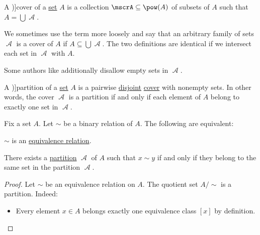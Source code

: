 \begin{comments}
\begin{definition}\label{def:set_cover}
  A \term[ru=покрытие (\cite[32]{Гуров2013ТеорияРешёток})]{cover} of a \hyperref[def:set]{set} \( A \) is a collection \( \mscrA \subseteq \pow(A) \) of subsets of \( A \) such that \( A = \bigcup \mscrA \).
\end{definition}
\begin{comments}
  \item We sometimes use the term more loosely and say that an arbitrary family of sets \( \mscrA \) is a cover of \( A \) if \( A \subseteq \bigcup \mscrA \). The two definitions are identical if we intersect each set in \( \mscrA \) with \( A \).

  \item Some authors like \cite[32]{Гуров2013ТеорияРешёток} additionally disallow empty sets in \( \mscrA \).
\end{comments}

\begin{definition}\label{def:set_partition}
  A \term[ru=разбиение (\cite[32]{Гуров2013ТеорияРешёток})]{partition} of a \hyperref[def:set]{set} \( A \) is a pairwise \hyperref[def:disjoint_sets]{disjoint} \hyperref[def:set_cover]{cover} with nonempty sets. In other words, the cover \( \mscrA \) is a partition if and only if each element of \( A \) belong to exactly one set in \( \mscrA \).
\end{definition}

\begin{proposition}\label{thm:equivalence_partition}
  Fix a set \( A \). Let \( {\sim} \) be a binary relation of \( A \). The following are equivalent:
  \begin{thmenum}
     \( {\sim} \) is an \hyperref[def:equivalence_relation]{equivalence relation}.

     There exists a \hyperref[def:set_partition]{partition} \( \mscrA \) of \( A \) such that \( x \sim y \) if and only if they belong to the same set in the partition \( \mscrA \).
  \end{thmenum}
\end{proposition}
\begin{proof}
   Let \( {\sim} \) be an equivalence relation on \( A \). The quotient set \( A / {\sim} \) is a partition. Indeed:
  \begin{itemize}
    \item Every element \( x \in A \) belongs exactly one equivalence class \( [x] \) by definition.


\end{itemize}
\end{proof}
\end{comments}
